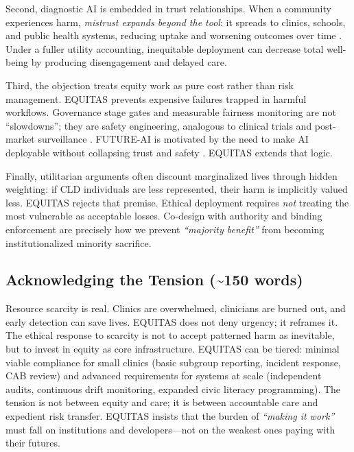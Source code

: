 \documentclass[12pt,a4paper]{article}
\begin{document}
Second, diagnostic AI is embedded in trust relationships. When a community experiences harm, \textit{mistrust expands beyond the tool}: it spreads to clinics, schools, and public health systems, reducing uptake and worsening outcomes over time \citep{Sagona2025}. Under a fuller utility accounting, inequitable deployment can decrease total well-being by producing disengagement and delayed care.

Third, the objection treats equity work as pure cost rather than risk management. EQUITAS prevents expensive failures trapped in harmful workflows. Governance stage gates and measurable fairness monitoring are not ``slowdowns''; they are safety engineering, analogous to clinical trials and post-market surveillance \citep{Chen2023}. FUTURE-AI is motivated by the need to make AI deployable without collapsing trust and safety \citep{Lekadir2025}. EQUITAS extends that logic.

Finally, utilitarian arguments often discount marginalized lives through hidden weighting: if CLD individuals are less represented, their harm is implicitly valued less. EQUITAS rejects that premise. Ethical deployment requires \textit{not} treating the most vulnerable as acceptable losses. Co-design with authority \citep{Nadarzynski2024} and binding enforcement \citep{Munn2023} are precisely how we prevent \textit{``majority benefit''} from becoming institutionalized minority sacrifice.

\subsection{Acknowledging the Tension (\texorpdfstring{\textasciitilde}{~}150 words)}
Resource scarcity is real. Clinics are overwhelmed, clinicians are burned out, and early detection can save lives. EQUITAS does not deny urgency; it reframes it. The ethical response to scarcity is not to accept patterned harm as inevitable, but to invest in equity as core infrastructure. EQUITAS can be tiered: minimal viable compliance for small clinics (basic subgroup reporting, incident response, CAB review) and advanced requirements for systems at scale (independent audits, continuous drift monitoring, expanded civic literacy programming). The tension is not between equity and care; it is between accountable care and expedient risk transfer. EQUITAS insists that the burden of \textit{``making it work''} must fall on institutions and developers—not on the weakest ones paying with their futures.
\end{document}
